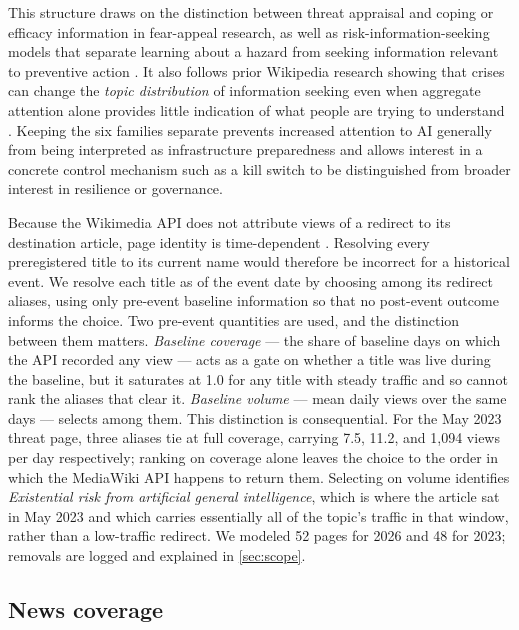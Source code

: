 \elsevierclasstrue\documentclass[preprint,12pt]{elsarticle}%
\begin{document}
This structure draws on the distinction between threat appraisal and coping or efficacy information in fear-appeal research, as well as risk-information-seeking models that separate learning about a hazard from seeking information relevant to preventive action \citep{witte1992eppm,griffin1999risp,kahlor2010prism}. It also follows prior Wikipedia research showing that crises can change the \emph{topic distribution} of information seeking even when aggregate attention alone provides little indication of what people are trying to understand \citep{ribeiro2021wikipedia}. 
Keeping the six families separate prevents increased attention to AI generally from being interpreted as infrastructure preparedness and allows interest in a concrete control mechanism such as a kill switch to be distinguished from broader interest in resilience or governance.

Because the Wikimedia API does not attribute views of a redirect to its destination article, page identity is time-dependent \citep{wikimedia2026api}. Resolving every preregistered title to its current name would therefore be incorrect for a historical event. We resolve each title as of the event date by choosing among its redirect aliases, using only pre-event baseline information so that no post-event outcome informs the choice. Two pre-event quantities are used, and the distinction between them matters. \emph{Baseline coverage} --- the share of baseline days on which the API recorded any view --- acts as a gate on whether a title was live during the baseline, but it saturates at 1.0 for any title with steady traffic and so cannot rank the aliases that clear it. \emph{Baseline volume} --- mean daily views over the same days --- selects among them. This distinction is consequential. For the May 2023 threat page, three aliases tie at full coverage, carrying 7.5, 11.2, and 1{,}094 views per day respectively; ranking on coverage alone leaves the choice to the order in which the MediaWiki API happens to return them. Selecting on volume identifies \emph{Existential risk from artificial general intelligence}, which is where the article sat in May 2023 and which carries essentially all of the topic's traffic in that window, rather than a low-traffic redirect. We modeled 52 pages for 2026 and 48 for 2023; removals are logged and explained in \cref{sec:scope}.


\subsection{News coverage}
\end{document}
